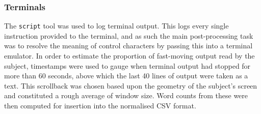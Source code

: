 \subsubsection*{Terminals}
The \texttt{script} tool was used to log terminal output.  This logs every single instruction provided to the terminal, and as such the main post-processing task was to resolve the meaning of control characters by passing this into a terminal emulator.  In order to estimate the proportion of fast-moving output read by the subject, timestamps were used to gauge when terminal output had stopped for more than 60 seconds, above which the last 40 lines of output were taken as a text.  This scrollback was chosen based upon the geometry of the subject's screen and constituted a rough average of window size.  Word counts from these were then computed for insertion into the normalised CSV format.



